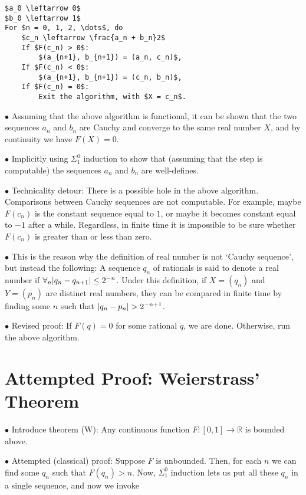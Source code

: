 \documentclass{article}
\theoremstyle{nonumberplain}
\newcommand{\R}{\mathbb{R}}
\DeclarePairedDelimiter{\abs}{\lvert}{\rvert}
\newcommand\point[1]{\noindent \hspace{\labelsep} $\bullet$ #1 \smallskip}
\newcommand\timestamp[1]{}
\begin{document}
\begin{lstlisting}
$a_0 \leftarrow 0$
$b_0 \leftarrow 1$
For $n = 0, 1, 2, \dots$, do
    $c_n \leftarrow \frac{a_n + b_n}2$
    If $F(c_n) > 0$:
        $(a_{n+1}, b_{n+1}) = (a_n, c_n)$,
    If $F(c_n) < 0$:
        $(a_{n+1}, b_{n+1}) = (c_n, b_n)$,
    If $F(c_n) = 0$:
        Exit the algorithm, with $X = c_n$.
\end{lstlisting}

\point{Assuming that the above algorithm is functional, it can be shown that the two sequences $a_n$ and $b_n$ are Cauchy and converge to the same real number $X$, and by continuity we have $F(X) = 0$.}

\point{Implicitly using $\Sigma^0_1$ induction to show that (assuming that the step is computable) the sequences $a_n$ and $b_n$ are well-defines.}

\point{Technicality detour: There is a possible hole in the above algorithm. Comparisons between Cauchy sequences are not computable. For example, maybe $F(c_n)$ is the constant sequence equal to $1$, or maybe it becomes constant equal to $-1$ after a while. Regardless, in finite time it is impossible to be sure whether $F(c_n)$ is greater than or less than zero.}

\point{This is the reason why the definition of real number is not `Cauchy sequence', but instead the following: A sequence $q_n$ of rationals is said to denote a real number if $\forall_n \abs{q_n - q_{n+1}} \leq 2^{-n}$. Under this definition, if $X = (q_n)$ and $Y = (p_n)$ are distinct real numbers, they can be compared in finite time by finding some $n$ such that $\abs{q_n - p_n} > 2^{-n+1}$.}

\point{Revised proof: If $F(q) = 0$ for some rational $q$, we are done. Otherwise, run the above algorithm.}

\timestamp{30 minutes}

\section{Attempted Proof: Weierstrass' Theorem}

\point{Introduce theorem (W): Any continuous function $F \colon [0,1] \to \R$ is bounded above.}

\point{Attempted (classical) proof: Suppose $F$ is unbounded. Then, for each $n$ we can find some $q_n$ such that $F(q_n) > n$. Now, $\Sigma^0_1$ induction lets us put all these $q_n$ in a single sequence, and now we invoke}
\end{document}
